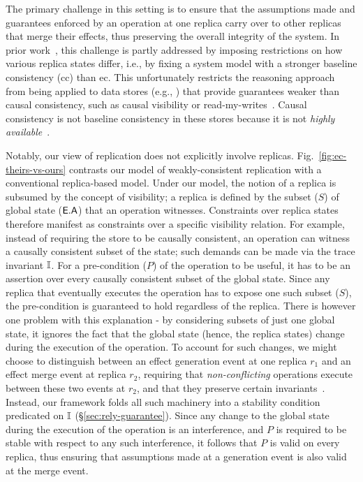 The primary challenge in this setting is to ensure that the
assumptions made and guarantees enforced by an operation at one
replica carry over to other replicas that merge their effects, thus
preserving the overall integrity of the system.  In prior
work~\cite{lbc16,gotsmanpopl16}, this challenge is partly addressed by
imposing restrictions on how various replica states differ, i.e., by
fixing a system model with a stronger baseline consistency ({\sc cc})
than {\sc ec}. This unfortunately restricts the reasoning approach
from being applied to data stores (e.g., \cite{bayou,pldi15}) that
provide guarantees weaker than causal consistency, such as causal
visibility or read-my-writes~\cite{zoo}. Causal consistency is not
baseline consistency in these stores because it is not \emph{highly
  available}~\cite{bailishat}.

Notably, our view of replication does not explicitly involve replicas.
Fig.~\ref{fig:ec-theirs-vs-ours} contrasts our model of
weakly-consistent replication with a conventional replica-based model.
Under our model, the notion of a replica is subsumed by the concept of
visibility; a replica is defined by the subset ($S$) of global state
($\textsf{E}.\textsf{A}$) that an operation witnesses. Constraints over replica states
therefore manifest as constraints over a specific visibility relation.
For example, instead of requiring the store to be causally consistent,
an operation can witness a causally consistent subset of the state;
such demands can be made via the trace invariant $\mathbb{I}$. For a
pre-condition ($P$) of the operation to be useful, it has to be an
assertion over every causally consistent subset of the global state.
Since any replica that eventually executes the operation has to expose
one such subset ($S$), the pre-condition is guaranteed to hold
regardless of the replica. There is however one problem with this
explanation - by considering subsets of just one global state, it
ignores the fact that the global state (hence, the replica states)
change during the execution of the operation. To account for such
changes, we might choose to distinguish between an effect generation
event at one replica $r_1$ and an effect merge event at replica $r_2$,
requiring that \emph{non-conflicting} operations execute between these
two events at $r_2$, and that they preserve certain
invariants~\cite{gotsmanpopl16}.  Instead, our framework folds all such
machinery into a stability condition predicated on $\mathbb{I}$
(\S\ref{sec:rely-guarantee}).  Since any change to the global state
during the execution of the operation is an interference, and $P$ is
required to be stable with respect to any such interference, it
follows that $P$ is valid on every replica, thus ensuring that
assumptions made at a generation event is also valid at the merge
event.

